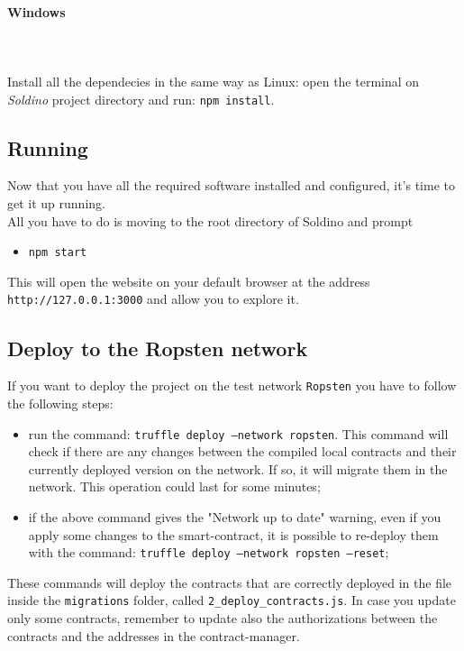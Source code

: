 \paragraph{Windows} \mbox{} \\ \mbox{} \\
Install all the dependecies in the same way as Linux: open the terminal on \textit{Soldino} project directory and run: \texttt{npm install}.

\subsection{Running}
Now that you have all the required software installed and configured, it's time to get it up running.\\
All you have to do is moving to the root directory of Soldino and prompt
\begin{itemize}
	\item[]\texttt{npm start}
\end{itemize}
This will open the website on your default browser at the address \texttt{http://127.0.0.1:3000} and allow you to explore it.
\subsection{Deploy to the Ropsten network}
If you want to deploy the project on the test network \texttt{Ropsten} you have to follow the following steps:
\begin{itemize}
	\item run the command:     \texttt{truffle deploy ---network ropsten}. This command will check if there are any changes between the compiled local contracts and their currently deployed version on the network. If so, it will migrate them in the network. This operation could last for some minutes;
	\item if the above command gives the "Network up to date" warning, even if you apply some changes to the smart-contract, it is possible to re-deploy them with the command: \texttt{truffle deploy ---network ropsten ---reset};    
\end{itemize}
These commands will deploy the contracts that are correctly deployed in the file inside the \texttt{migrations} folder, called \texttt{2\_deploy\_contracts.js}. In case you update only some contracts, remember to update also the authorizations between the contracts and the addresses in the contract-manager.

